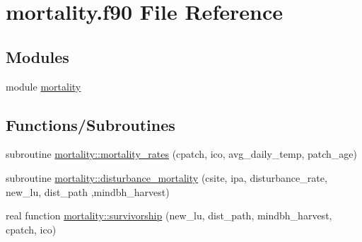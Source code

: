 \hypertarget{mortality_8f90}{}\section{mortality.\+f90 File Reference}
\label{mortality_8f90}
\subsection*{Modules}
\begin{DoxyCompactItemize}
\item 
module \hyperlink{namespacemortality}{mortality}
\end{DoxyCompactItemize}
\subsection*{Functions/\+Subroutines}
\begin{DoxyCompactItemize}
\item 
subroutine \hyperlink{namespacemortality_af7ebabdd3dd650224f2a5ddfac2f888e}{mortality\+::mortality\+\_\+rates} (cpatch, ico, avg\+\_\+daily\+\_\+temp, patch\+\_\+age)
\item 
subroutine \hyperlink{namespacemortality_aaa157cb2fd70d8ed380faf7ea77a1fd3}{mortality\+::disturbance\+\_\+mortality} (csite, ipa, disturbance\+\_\+rate, new\+\_\+lu, dist\+\_\+path                                                                                                                                                                                   ,mindbh\+\_\+harvest)
\item 
real function \hyperlink{namespacemortality_aae8b4072e1f5c7c59cc76370de99d271}{mortality\+::survivorship} (new\+\_\+lu, dist\+\_\+path, mindbh\+\_\+harvest, cpatch, ico)
\end{DoxyCompactItemize}
